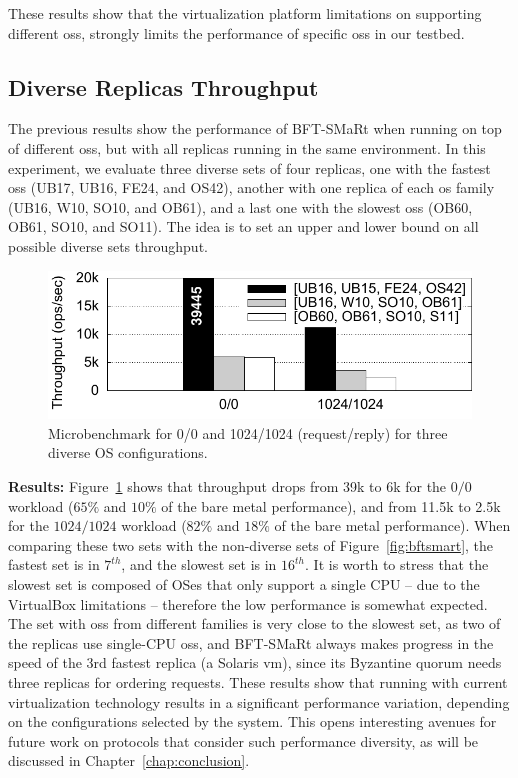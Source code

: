 These results show that the virtualization platform limitations on supporting different \glspl{os}, strongly limits the performance of specific \glspl{os} in our testbed.


\subsection{Diverse Replicas Throughput}
\label{sec:performancediversity}

The previous results show the performance of BFT-SMaRt when running on top of different \glspl{os}, but with all replicas running in the same environment.
In this experiment, we evaluate three diverse sets of four replicas, one with the fastest \glspl{os} (UB17, UB16, FE24, and OS42), another with one replica of each \gls{os} family (UB16, W10, SO10, and OB61), and a last one with the slowest \glspl{os} (OB60, OB61, SO10, and SO11).
The idea is to set an upper and lower bound on all possible diverse sets throughput.

\begin{figure}[h]
\begin{center}
\includegraphics[width=\columnwidth]{images/gnuplot/vagrant/runs_diversity/throughput.pdf}
\caption{Microbenchmark for 0/0 and 1024/1024 (request/reply) for three diverse OS configurations.}
\label{fig:diversets}
\end{center}
\end{figure}


\textbf{Results:}
Figure~\ref{fig:diversets} shows that throughput drops from 39k to 6k for the $0/0$ workload ($65\%$ and $10\%$ of the bare metal performance), and from 11.5k to 2.5k for the $1024/1024$ workload ($82\%$ and $18\%$ of the bare metal performance).
When comparing these two sets with the non-diverse sets of Figure~\ref{fig:bftsmart}, the fastest set is in $7^{th}$, and the slowest set is in $16^{th}$.
It is worth to stress that the slowest set is composed of OSes that only support a single CPU -- due to the VirtualBox limitations -- therefore the low performance is somewhat expected.
The set with \glspl{os} from different families is very close to the slowest set, as two of the replicas use single-CPU \glspl{os}, and BFT-SMaRt always makes progress in the speed of the 3rd fastest replica (a Solaris \gls{vm}), since its Byzantine quorum needs three replicas for ordering requests.
These results show that running \system with current virtualization technology results in a significant performance variation, depending on the configurations selected by the system.
This opens interesting avenues for future work on protocols that consider such performance diversity, as will be discussed in Chapter~\ref{chap:conclusion}.

